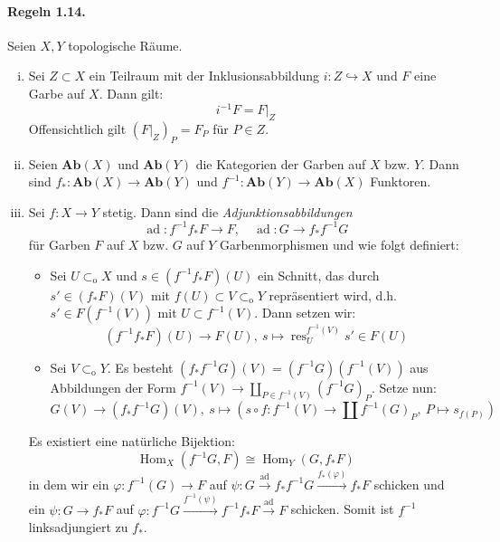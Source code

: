 \documentclass[11pt,b5paper,openany]{memoir}
\begin{document}
\paragraph{Regeln 1.14.}\label{1.14} Seien $X,Y$ topologische Räume.
\begin{enumerate}[(i)]
\item Sei $Z\subset X$ ein Teilraum mit der Inklusionsabbildung $i:Z\hookrightarrow X$ und $F$ eine Garbe auf $X$. Dann gilt:
\[i^{-1}F = F|_Z \]
Offensichtlich gilt $(F|_Z)_P=F_P$ für $P\in Z$.
\item Seien $\mathbf{Ab}(X)$ und $\mathbf{Ab}(Y)$ die Kategorien der Garben auf $X$ bzw. $Y$. Dann sind $f_\ast:\mathbf{Ab}(X)\to\mathbf{Ab}(Y)$ und $f^{-1}:\mathbf{Ab}(Y)\to\mathbf{Ab}(X)$ Funktoren.
\item Sei $f:X\to Y$ stetig. Dann sind die \textit{Adjunktionsabbildungen} 
\[\operatorname{ad}:f^{-1}f_\ast F\to F,\quad\operatorname{ad} :G\to f_\ast f^{-1}G \]
für Garben $F$ auf $X$ bzw. $G$ auf $Y$ Garbenmorphismen und wie folgt definiert:
\begin{itemize}
\item Sei $U\subset_\text{o}X$ und $s\in (f^{-1}f_\ast F)(U)$ ein Schnitt, das durch $s'\in (f_\ast F)(V)$ mit $f(U)\subset V\subset_\text{o}Y$ repräsentiert wird, d.h. $s'\in F(f^{-1}(V))$ mit $U\subset f^{-1}(V)$. Dann setzen wir: 
\[(f^{-1}f_\ast F)(U)\to F(U),\ s\mapsto \operatorname{res}_U^{f^{-1}(V)}s'\in F(U)\]
\item Sei $V\subset_\text{o}Y$. Es besteht $(f_\ast f^{-1}G)(V)=(f^{-1}G)(f^{-1}(V))$ aus Abbildungen der Form $f^{-1}(V)\to\coprod_{P\in f^{-1}(V)}(f^{-1}G)_P$. Setze nun:
\[G(V)\to (f_\ast f^{-1}G)(V),\ s\mapsto (s\circ f: f^{-1}(V)\to\coprod  f^{-1}(G)_P,\ P\mapsto s_{f(P)}) \]
\end{itemize}
Es existiert eine natürliche Bijektion:
\[\operatorname{Hom}_X(f^{-1}G,F)\cong\operatorname{Hom}_Y(G,f_\ast F) \]
in dem wir ein $\varphi:f^{-1}(G)\to F$ auf $\psi: G\stackrel{\operatorname{ad}}{\longrightarrow} f_\ast f^{-1}G\stackrel{f_\ast(\varphi)}{\longrightarrow} f_\ast F$ schicken und ein $\psi:G\to f_\ast F$ auf $\varphi:f^{-1}G \stackrel{f^{-1}(\psi)}{\longrightarrow} f^{-1}f_\ast F\stackrel{\operatorname{ad}}{\longrightarrow}F$ schicken. Somit ist $f^{-1}$ linksadjungiert zu $f_\ast$.
\end{enumerate}
\end{document}
